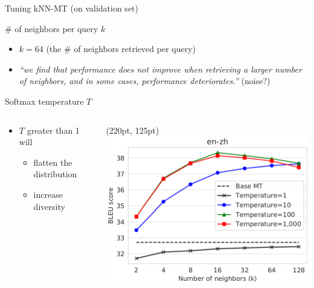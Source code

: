 \documentclass[unicode, 12pt, xdvipdfmx, aspectratio=169]{beamer}
\begin{document}
\begin{frame}[label={sec:org24739ce}]{Tuning kNN-MT (on validation set)}
\begin{block}{\# of neighbors per query \(k\)}
\begin{itemize}
\item \(k = 64\) (the \# of neighbors retrieved per query)
\item \textit{``we find that performance does not improve when retrieving a larger number of neighbors, and in some cases, performance deteriorates.''} (noise?)
\end{itemize}
\end{block}

\begin{block}{Softmax temperature \(T\)}
\begin{columns}
\begin{column}{0.5\columnwidth}
\begin{itemize}
\item \(T\) greater than 1 will
\begin{itemize}
\item flatten the distribution
\item increase diversity
\end{itemize}
\end{itemize}
\end{column}
\begin{column}{0.4\columnwidth}
\begin{textblock*}{\linewidth}(220pt, 125pt)
 \includegraphics[width=\linewidth]{./figure/Figure2.pdf}
\end{textblock*}
\end{column}
\end{columns}
\end{block}
\end{frame}
\end{document}
